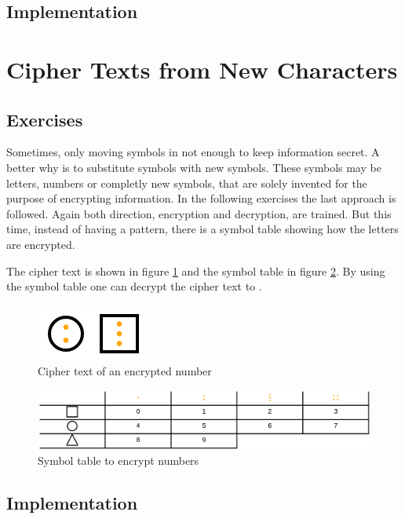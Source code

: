 \subsection{Implementation}

\section{Cipher Texts from New Characters}
\label{section:symbols}

\subsection{Exercises}
Sometimes, only moving symbols in not enough to keep information secret. A better why is to substitute symbols with new symbols. These symbols may be letters, numbers or completly new symbols, that are solely invented for the purpose of encrypting information.
In the following exercises the last approach is followed. Again both direction, encryption and decryption, are trained. But this time, instead of having a pattern, there is a symbol table showing how the letters are encrypted. 

\begin{example}
    The cipher text is shown in figure \ref{fig:cipher_number} and the symbol table in figure \ref{fig:symbol_table}. By using the symbol table one can decrypt the cipher text to .
\end{example}

\begin{figure} 
    \centering
    \includegraphics[width=0.2 \columnwidth]{figures/cipher_number.png}
    \caption{Cipher text of an encrypted number} 
    \label{fig:cipher_number} 
\end{figure}

\begin{figure} 
    \centering
    \includegraphics[width=1.0 \columnwidth]{figures/symbol_table.png}
    \caption{Symbol table to encrypt numbers} 
    \label{fig:symbol_table} 
\end{figure}

\subsection{Implementation}

